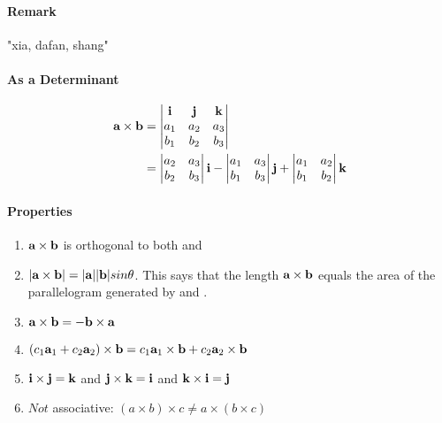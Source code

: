 \documentclass[11pt]{article}
\begin{document}
\paragraph{Remark} "xia, dafan, shang"
\paragraph{As a Determinant}
\begin{align*}
	\textbf{a} \times \textbf{b} &= \begin{vmatrix}
		\textbf{i} & \textbf{j} & \textbf{k} \\
		a_1 & a_2 & a_3 \\
		b_1 & b_2 & b_3
	\end{vmatrix} \\
	&= \begin{vmatrix}
		a_2 & a_3 \\
		b_2 & b_3 \\
	\end{vmatrix} \textbf{i} - \begin{vmatrix}
		a_1 & a_3 \\
		b_1 & b_3 \\
	\end{vmatrix} \textbf{j} +  \begin{vmatrix}
		a_1 & a_2 \\
		b_1 & b_2 \\
	\end{vmatrix} \textbf{k}
\end{align*}

\paragraph{Properties}
\begin{enumerate}
	\item $\textbf{a} \times \textbf{b}$ is orthogonal to both  and 
	\item $|\textbf{a} \times \textbf{b}| = |\textbf{a}||\textbf{b}|sin\theta$. This says that the length $\textbf{a} \times \textbf{b}$ equals the area of the parallelogram generated by  and .
	\item $\textbf{a} \times \textbf{b} = -\textbf{b} \times \textbf{a}$
	\item $(c_1\textbf{a}_1 + c_2\textbf{a}_2) \times \textbf{b} = c_1\textbf{a}_1 \times \textbf{b} + c_2\textbf{a}_2 \times \textbf{b}$
	\item $\textbf{i} \times \textbf{j} = \textbf{k}$ and $\textbf{j} \times \textbf{k} = \textbf{i}$ and $\textbf{k} \times \textbf{i} = \textbf{j}$
	\item $Not$ associative: $(a \times b) \times c \neq a \times (b \times c)$
\end{enumerate} 
\end{document}
